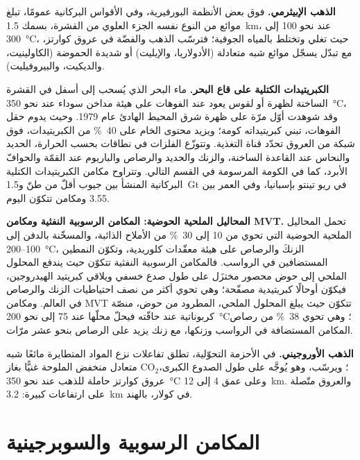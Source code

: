 \textbf{الذهب الإبيثرمي.} فوق بعض الأنظمة البورفيرية، وفي الأقواس البركانية عمومًا، تبلغ موائع
من النوع نفسه الجزء العلوي من القشرة، بسمك \qty{1.5}{km}، عند نحو 100 إلى \qty{300}{\celsius}،
حيث تغلي وتختلط بالمياه الجوفية؛ فترسّب الذهب والفضّة في عروق كوارتز، مع
تبدّل يسجّل موائع شبه متعادلة (الأدولاريا، والإيليت) أو شديدة الحموضة (الكاولينيت،
والديكيت، والبيروفيليت).

\textbf{الكبريتيدات الكتلية على قاع البحر.} ماء البحر الذي يُسحب إلى أسفل في القشرة الساخنة لظهرة أو
لقوس يعود عند الفوهات على هيئة مداخن سوداء عند نحو \qty{350}{\celsius}، وقد شوهدت أوّل مرّة على ظهرة شرق
المحيط الهادئ عام 1979. وحيث يدوم حقل الفوهات، تبني كبريتيداته كومة؛ ويزيد محتوى الخام على
\qty{40}{\percent} من الكبريتيدات، فوق شبكة من العروق تحدّد قناة التغذية. وتتوزّع الفلزات في نطاقات
بحسب الحرارة، الحديد والنحاس عند القاعدة الساخنة، والزنك والحديد والرصاص والباريوم عند القمّة والحوافّ
الأبرد، كما في الكومة المرسومة في القسم التالي. وتتراوح مكامن الكبريتيدات الكتلية البركانية المنشأ
بين جيوب أقلّ من طنّ و\qty{1.5}{Gt} في ريو تينتو بإسبانيا، وفي
العمر بين \qty{3.55}{\Ga} ومكامن تتكوّن اليوم.

\textbf{المحاليل الملحية الحوضية: المكامن الرسوبية النفثية ومكامن MVT.} تحمل المحاليل الملحية الحوضية التي تحوي من 10 إلى \qty{30}{\percent} من الأملاح الذائبة،
والمسخّنة بالدفن إلى 100--\qty{200}{\celsius}، الزنكَ والرصاص على هيئة معقّدات كلوريدية، وتكوّن
النمطين المستضافين في الرواسب. فالمكامن الرسوبية النفثية تتكوّن حيث يندفع المحلول الملحي إلى حوض محصور مختزَل
على طول صدع خسفي ويلاقي كبريتيد الهيدروجين، فيكوّن أوحالًا كبريتيدية مصفّحة؛ وهي تحوي أكثر
من نصف احتياطيات الزنك والرصاص في العالم. ومكامن MVT تتكوّن حيث يبلغ المحلول الملحي، المطرود من
حوض، منصّة كربوناتية عند حافّته فيحلّ محلّها عند 75 إلى نحو
\qty{200}{\celsius}؛ وهي تحوي \qty{38}{\percent} من رصاص المكامن المستضافة في الرواسب وزنكها،
مع زنك يزيد على الرصاص بنحو عشر مرّات.

\textbf{الذهب الأوروجيني.} في الأحزمة التحوّلية، تطلق تفاعلات نزع المواد المتطايرة مائعًا شبه متعادل
منخفض الملوحة غنيًّا بغاز CO$_2$؛ ويرسّب، وهو يُوجَّه على طول الصدوع الكبرى، عروق كوارتز حاملة للذهب
عند نحو \qty{350}{\celsius} وعلى عمق 4 إلى \qty{12}{km}. والعروق متّصلة على
ارتفاعات كبيرة: \qty{3.2}{km} في كولار، بالهند.

\section{المكامن الرسوبية والسوبرجينية}\label{sec:b2:ore-deposits:sedimentary}

